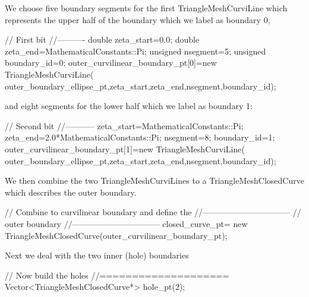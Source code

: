We choose five boundary segments for the first {\ttfamily Triangle\+Mesh\+Curvi\+Line} which represents the upper half of the boundary which we label as boundary 0,


\begin{DoxyCodeInclude}
   
   \textcolor{comment}{// First bit}
   \textcolor{comment}{//----------}
   \textcolor{keywordtype}{double} zeta\_start=0.0;
   \textcolor{keywordtype}{double} zeta\_end=MathematicalConstants::Pi;
   \textcolor{keywordtype}{unsigned} nsegment=5;
   \textcolor{keywordtype}{unsigned} boundary\_id=0;
   outer\_curvilinear\_boundary\_pt[0]=\textcolor{keyword}{new} TriangleMeshCurviLine(
    outer\_boundary\_ellipse\_pt,zeta\_start,zeta\_end,nsegment,boundary\_id);

\end{DoxyCodeInclude}


and eight segments for the lower half which we label as boundary 1\+:


\begin{DoxyCodeInclude}
   
   \textcolor{comment}{// Second bit}
   \textcolor{comment}{//-----------}
   zeta\_start=MathematicalConstants::Pi;
   zeta\_end=2.0*MathematicalConstants::Pi;
   nsegment=8;
   boundary\_id=1;
   outer\_curvilinear\_boundary\_pt[1]=\textcolor{keyword}{new} TriangleMeshCurviLine(
    outer\_boundary\_ellipse\_pt,zeta\_start,zeta\_end,nsegment,boundary\_id);

\end{DoxyCodeInclude}


We then combine the two {\ttfamily Triangle\+Mesh\+Curvi\+Lines} to a {\ttfamily Triangle\+Mesh\+Closed\+Curve} which describes the outer boundary.


\begin{DoxyCodeInclude}
   \textcolor{comment}{// Combine to curvilinear boundary and define the}
   \textcolor{comment}{//--------------------------------}
   \textcolor{comment}{// outer boundary}
   \textcolor{comment}{//--------------------------------}
   closed\_curve\_pt=
     \textcolor{keyword}{new} TriangleMeshClosedCurve(outer\_curvilinear\_boundary\_pt);

\end{DoxyCodeInclude}


Next we deal with the two inner (hole) boundaries


\begin{DoxyCodeInclude}
 \textcolor{comment}{// Now build the holes}
 \textcolor{comment}{//====================}
 Vector<TriangleMeshClosedCurve*> hole\_pt(2);

\end{DoxyCodeInclude}


